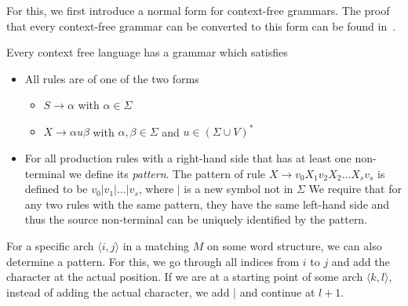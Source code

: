 For this, we first introduce a normal form for context-free grammars.
The proof that every context-free grammar can be converted to this form can be found in~\cite{Lautemann1995}.
\begin{lemma}
    Every context free language has a grammar which satisfies
    \begin{itemize}
        \setlength\itemsep{0.2em}
        \item All rules are of one of the two forms
        \begin{itemize}
            \setlength\itemsep{0.2em}
            \item $S \to \alpha$ with $\alpha \in \Sigma$
            \item $X \to \alpha u \beta$ with $\alpha, \beta \in \Sigma$ and $u \in (\Sigma \cup V)^{*}$
        \end{itemize}
        \item For all production rules with a right-hand side that has at least one non-terminal we define its \emph{pattern}.
        The pattern of rule $X \to v_{0}X_{1}v_{2}X_{2}\dots X_{s}v_{s}$ is defined to be $v_{0}|v_{1}|\dots|v_{s}$, where $|$ is a new symbol not in $\Sigma$
        We require that for any two rules with the same pattern, they have the same left-hand side and thus the source non-terminal can be uniquely identified by the pattern.
    \end{itemize}
\end{lemma}

For a specific arch $\langle i, j \rangle$ in a matching $M$ on some word structure, we can also determine a pattern.
For this, we go through all indices from $i$ to $j$ and add the character at the actual position.
If we are at a starting point of some arch $\langle k, l \rangle$, instead of adding the actual character, we add $|$ and continue at $l + 1$.

